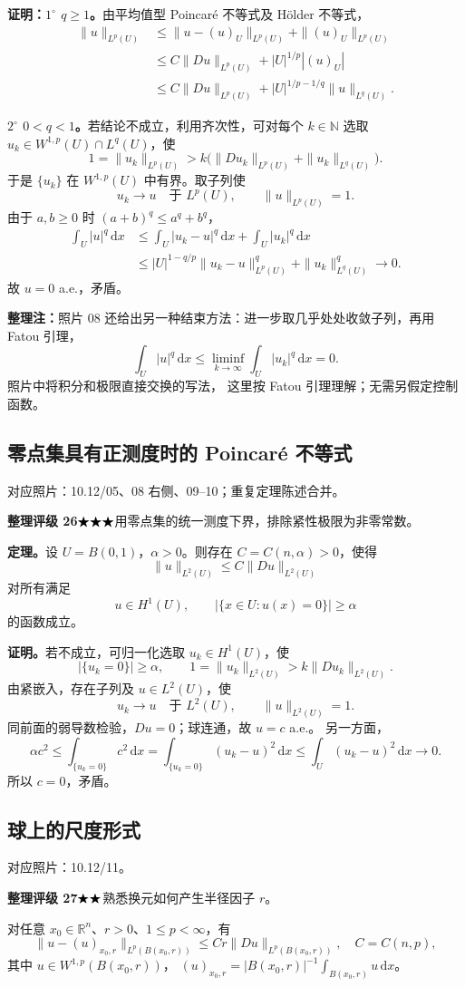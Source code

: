 \documentclass[UTF8,a4paper,11pt,fontset=fandol]{ctexart}
\newcommand{\R}{\mathbb R}
\newcommand{\N}{\mathbb N}
\newcommand{\dd}{\,\mathrm d}
\newcommand{\ednote}[1]{\par{\small\color{notegray}\textbf{整理注：}#1}\par}
\newcommand{\source}[1]{{\small\color{notegray}对应照片：#1。}\par}
\newcommand{\proofstars}[1]{\ensuremath{%
\ifnum#1>0\relax\bigstar\fi
\ifnum#1>1\relax\bigstar\fi
\ifnum#1>2\relax\bigstar\fi
\ifnum#1>3\relax\bigstar\fi
\ifnum#1>4\relax\bigstar\fi}}
\newcommand{\proofrating}[3]{\par{\small\color{proofblue}%
\textbf{整理评级 #1}\enspace\proofstars{#2}\quad #3\par}}
\begin{document}
\textbf{证明：$1^\circ$ $q\geq1$。}由平均值型 Poincaré 不等式及 Hölder 不等式，
\[
\begin{aligned}
\|u\|_{L^p(U)}
&\leq\|u-(u)_U\|_{L^p(U)}+\|(u)_U\|_{L^p(U)}\\
&\leq C\|Du\|_{L^p(U)}+|U|^{1/p}|(u)_U|\\
&\leq C\|Du\|_{L^p(U)}+|U|^{1/p-1/q}\|u\|_{L^q(U)}.
\end{aligned}
\]

\textbf{$2^\circ$ $0<q<1$。}若结论不成立，利用齐次性，可对每个 $k\in\N$ 选取
$u_k\in W^{1,p}(U)\cap L^q(U)$，使
\[
1=\|u_k\|_{L^p(U)}
>k\bigl(\|Du_k\|_{L^p(U)}+\|u_k\|_{L^q(U)}\bigr).
\]
于是 $\{u_k\}$ 在 $W^{1,p}(U)$ 中有界。取子列使
\[
u_k\longrightarrow u\quad\text{于 }L^p(U),\qquad
\|u\|_{L^p(U)}=1.
\]
由于 $a,b\geq0$ 时 $(a+b)^q\leq a^q+b^q$，
\[
\begin{aligned}
\int_U|u|^q\dd x
&\leq\int_U|u_k-u|^q\dd x+\int_U|u_k|^q\dd x\\
&\leq |U|^{1-q/p}\|u_k-u\|_{L^p(U)}^q+\|u_k\|_{L^q(U)}^q
\longrightarrow0.
\end{aligned}
\]
故 $u=0$ a.e.，矛盾。
\ednote{照片 08 还给出另一种结束方法：进一步取几乎处处收敛子列，再用 Fatou 引理，
\[
\int_U|u|^q\dd x\leq\liminf_{k\to\infty}\int_U|u_k|^q\dd x=0.
\]
照片中将积分和极限直接交换的写法，
这里按 Fatou 引理理解；无需另假定控制函数。}

\newpage
\subsection{零点集具有正测度时的 Poincaré 不等式}
\source{10.12/05、08 右侧、09--10；重复定理陈述合并}
\proofrating{26}{3}{用零点集的统一测度下界，排除紧性极限为非零常数。}
\textbf{定理。}设 $U=B(0,1)$，$\alpha>0$。则存在 $C=C(n,\alpha)>0$，使得
\[
\boxed{\|u\|_{L^2(U)}\leq C\|Du\|_{L^2(U)}}
\]
对所有满足
\[
u\in H^1(U),\qquad |\{x\in U:u(x)=0\}|\geq\alpha
\]
的函数成立。

\textbf{证明。}若不成立，可归一化选取 $u_k\in H^1(U)$，使
\[
|\{u_k=0\}|\geq\alpha,\qquad
1=\|u_k\|_{L^2(U)}>k\|Du_k\|_{L^2(U)}.
\]
由紧嵌入，存在子列及 $u\in L^2(U)$，使
\[
u_k\longrightarrow u\quad\text{于 }L^2(U),\qquad\|u\|_{L^2(U)}=1.
\]
同前面的弱导数检验，$Du=0$；球连通，故 $u=c$ a.e.。
另一方面，
\[
\alpha c^2
\leq\int_{\{u_k=0\}}c^2\dd x
=\int_{\{u_k=0\}}(u_k-u)^2\dd x
\leq\int_U(u_k-u)^2\dd x\longrightarrow0.
\]
所以 $c=0$，矛盾。

\subsection{球上的尺度形式}
\source{10.12/11}
\proofrating{27}{2}{熟悉换元如何产生半径因子 $r$。}
对任意 $x_0\in\R^n$、$r>0$、$1\leq p<\infty$，有
\[
\boxed{\|u-(u)_{x_0,r}\|_{L^p(B(x_0,r))}
\leq Cr\|Du\|_{L^p(B(x_0,r))},\quad C=C(n,p),}
\]
其中 $u\in W^{1,p}(B(x_0,r))$，
$ (u)_{x_0,r}=|B(x_0,r)|^{-1}\int_{B(x_0,r)}u\dd x$。
\end{document}
